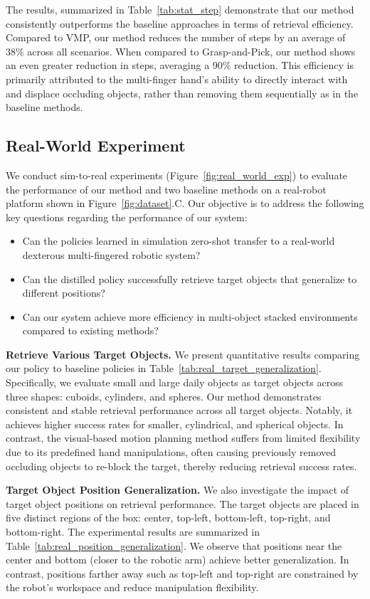 \documentclass[10pt, a4paper, logo, twocolumn, copyright]{psibot} %
\begin{document}
The results, summarized in Table~\ref{tab:stat_step} demonstrate that our method consistently outperforms the baseline approaches in terms of retrieval efficiency. Compared to VMP, our method reduces the number of steps by an average of 38\% across all scenarios. When compared to Grasp-and-Pick, our method shows an even greater reduction in steps, averaging a 90\% reduction. This efficiency is primarily attributed to the multi-finger hand's ability to directly interact with and displace occluding objects, rather than removing them sequentially as in the baseline methods.

\subsection{Real-World Experiment}
We conduct sim-to-real experiments (Figure~\ref{fig:real_world_exp}) to evaluate the performance of our method and two baseline methods on a real-robot platform shown in Figure~\ref{fig:dataset}.C. Our objective is to address the following key questions regarding the performance of our system:
\begin{itemize}
\item Can the policies learned in simulation zero-shot transfer to a real-world dexterous multi-fingered robotic system?
\item Can the distilled policy successfully retrieve target objects that generalize to different positions?
\item Can our system achieve more efficiency in multi-object stacked environments compared to existing methods?
\end{itemize}

\noindent \textbf{Retrieve Various Target Objects.} We present quantitative results comparing our policy to baseline policies in Table~\ref{tab:real_target_generalization}. Specifically, we evaluate small and large daily objects as target objects across three shapes: cuboids, cylinders, and spheres. Our method demonstrates consistent and stable retrieval performance across all target objects. Notably, it achieves higher success rates for smaller, cylindrical, and spherical objects. In contrast, the visual-based motion planning method suffers from limited flexibility due to its predefined hand manipulations, often causing previously removed occluding objects to re-block the target, thereby reducing retrieval success rates.



\noindent \textbf{Target Object Position Generalization.} We also investigate the impact of target object positions on retrieval performance. The target objects are placed in five distinct regions of the box: center, top-left, bottom-left, top-right, and bottom-right. The experimental results are summarized in Table~\ref{tab:real_position_generalization}. We observe that positions near the center and bottom (closer to the robotic arm) achieve better generalization. In contrast, positions farther away such as top-left and top-right are constrained by the robot's workspace and reduce manipulation flexibility.

\end{document}
